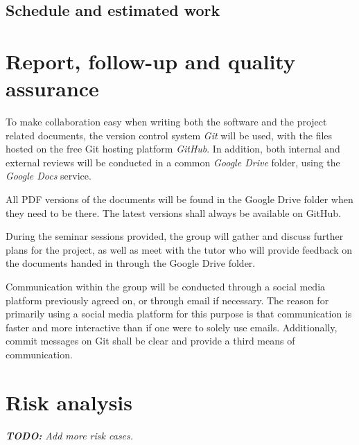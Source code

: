 \documentclass[12pt,titlepage]{article}
\begin{document}
\subsection{Schedule and estimated work}


\section{Report, follow-up and quality assurance}

To make collaboration easy when writing both the software and the project
related documents, the version control system \textit{Git} will be used, with
the files hosted on the free Git hosting platform \textit{GitHub}. In addition,
both internal and external reviews will be conducted in a common \textit{Google
Drive} folder, using the \textit{Google Docs} service.

All PDF versions of the documents will be found in the Google Drive folder when
they need to be there. The latest versions shall always be available on GitHub.

During the seminar sessions provided, the group will gather and discuss further
plans for the project, as well as meet with the tutor who will provide feedback
on the documents handed in through the Google Drive folder.

Communication within the group will be conducted through a social media platform
previously agreed on, or through email if necessary. The reason for primarily
using a social media platform for this purpose is that communication is faster
and more interactive than if one were to solely use emails. Additionally, commit
messages on Git shall be clear and provide a third means of communication.



\newpage
\appendix

\section{Risk analysis}
\label{app:risk-analysis}

\textit{\textbf{TODO:} Add more risk cases.} \\

\begin{usecase}
\end{usecase}
\end{document}
